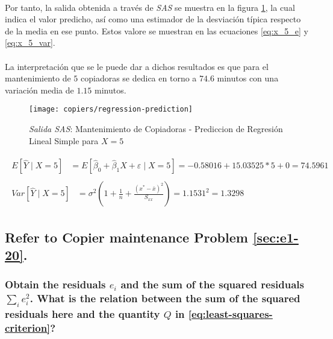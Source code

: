 \documentclass{article}
\begin{document}
        \paragraph{}
        Por tanto, la salida obtenida a través de \emph{SAS} se muestra en la figura \ref{img:copiers-regression-prediction}, la cual indica el valor predicho, así como una estimador de la desviación típica respecto de la media en ese punto. Estos valore se muestran en las ecuaciones \eqref{eq:x_5_e} y \eqref{eq:x_5_var}.

        \paragraph{}
        La interpretación que se le puede dar a dichos resultados es que para el mantenimiento de $5$ copiadoras se dedica en torno a $74.6$ minutos con una variación media de $1.15$ minutos.

        \begin{figure}[!h]
          \centering
          \texttt{[image: copiers/regression-prediction]}
          \caption{\emph{Salida SAS}: Mantenimiento de Copiadoras - Prediccion de Regresión Lineal Simple para $X = 5$}
          \label{img:copiers-regression-prediction}
        \end{figure}

        \begin{align}
        \label{eq:x_5_e}
          \begin{split}
            E\left[\widehat{Y} \mid X = 5\right] &=
            E\left[\widehat{\beta}_0 +\widehat{\beta}_1X + \varepsilon \mid X = 5\right]
            = -0.58016 + 15.03525 * 5 + 0 = 74.5961
          \end{split}\\
        \label{eq:x_5_var}
          \begin{split}
            Var\left[\widehat{Y} \mid X = 5\right] &=
            \sigma^2\left(1 + \frac{1}{n} + \frac{(x^* - \bar{x})^2}{S_{xx}}\right) =
            1.1531 ^ 2 =
            1.3298
          \end{split}
        \end{align}

    \setcounter{subsection}{23}
    \subsection{Refer to \textbf{Copier maintenance} Problem \ref{sec:e1-20}.}

      \subsubsection{Obtain the residuals $e_i$ and the sum of the squared residuals $\sum_i e_i^2$. What is the relation between the sum of the squared residuals here and the quantity $Q$ in \eqref{eq:least-squares-criterion}?}
\end{document}
